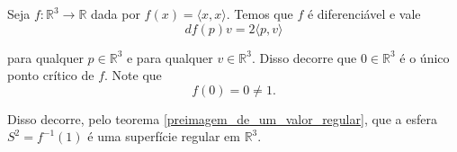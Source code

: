 \begin{exemplo}
Seja $f: \mathbb{R}^3 \rightarrow \mathbb{R}$ dada por $f(x) = \langle x,x \rangle$. Temos que $f$ é diferenciável e vale
\begin{equation*}
    df(p)v = 2 \langle p,v \rangle
\end{equation*}

para qualquer $p \in \mathbb{R}^3$ e para qualquer $v \in \mathbb{R}^3$. Disso decorre que $0 \in \mathbb{R}^3$ é o único ponto crítico de $f$. Note que
\begin{equation*}
    f(0) = 0 \neq 1.
\end{equation*}

Disso decorre, pelo teorema \ref{preimagem_de_um_valor_regular}, que a esfera $S^2 = f^{-1}(1)$ é uma superfície regular em $\mathbb{R}^3$.
\end{exemplo}

